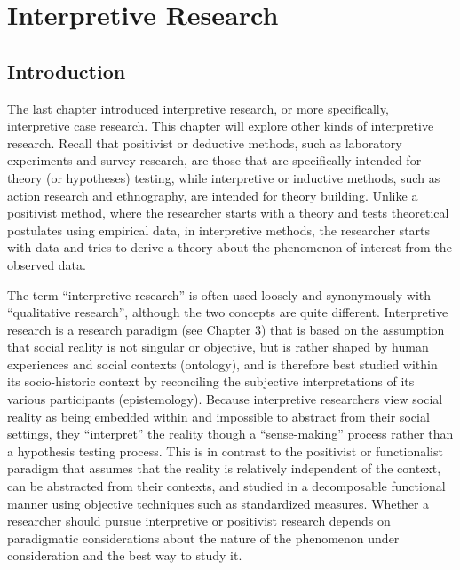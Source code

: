 \chapter{Interpretive Research}\label{ch11:interpretive_research}

\section{Introduction}\label{ch14:introduction}

The last chapter introduced interpretive research, or more specifically, interpretive case research. This chapter will explore other kinds of interpretive research. Recall that positivist or deductive methods, such as laboratory experiments and survey research, are those that are specifically intended for theory (or hypotheses) testing, while interpretive or inductive methods, such as action research and ethnography, are intended for theory building. Unlike a positivist method, where the researcher starts with a theory and tests theoretical postulates using empirical data, in interpretive methods, the researcher starts with data and tries to derive a theory about the phenomenon of interest from the observed data.

The term “interpretive research” is often used loosely and synonymously with “qualitative research”, although the two concepts are quite different. Interpretive research is a research paradigm (see Chapter 3) that is based on the assumption that social reality is not singular or objective, but is rather shaped by human experiences and social contexts (ontology), and is therefore best studied within its socio-historic context by reconciling the subjective interpretations of its various participants (epistemology). Because interpretive researchers view social reality as being embedded within and impossible to abstract from their social settings, they “interpret” the reality though a “sense-making” process rather than a hypothesis testing process. This is in contrast to the positivist or functionalist paradigm that assumes that the reality is relatively independent of the context, can be abstracted from their contexts, and studied in a decomposable functional manner using objective techniques such as standardized measures. Whether a researcher should pursue interpretive or positivist research depends on paradigmatic considerations about the nature of the phenomenon under consideration and the best way to study it.

